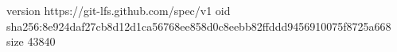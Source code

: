 version https://git-lfs.github.com/spec/v1
oid sha256:8e924daf27cb8d12d1ca56768ee858d0c8eebb82ffddd9456910075f8725a668
size 43840

